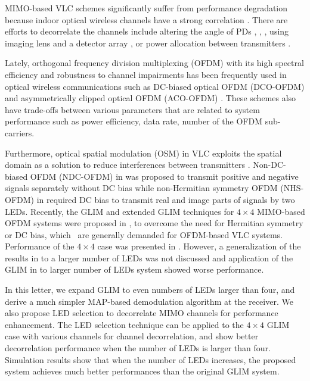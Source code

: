 \documentclass[12pt,letterpaper]{IEEEtran}
\begin{document}
MIMO-based VLC schemes significantly suffer from performance degradation because indoor optical wireless channels have a strong correlation \cite{fath_performance_2013}. There are efforts to decorrelate the channels include altering the angle of PDs \cite{fahamuel_improved_2014}, \cite{nuwanpriya_indoor_2015}, \cite{he_performance_2015}, using imaging lens and a detector array \cite{zeng_high_2009}, or power allocation between transmitters \cite{fath_performance_2013}.

Lately, orthogonal frequency division multiplexing (OFDM) with its high spectral efficiency and robustness to channel impairments has been frequently used in optical wireless communications \cite{armstrong_ofdm_2009} such as DC-biased optical OFDM (DCO-OFDM) \cite{tan_near-optimal_2016} and asymmetrically clipped optical OFDM (ACO-OFDM) \cite{armstrong_power_2006}. These schemes also have trade-offs between various parameters that are related to system performance such as power efficiency, data rate, number of the OFDM sub-carriers.

Furthermore, optical spatial modulation (OSM) in VLC exploits the spatial domain as a solution to reduce interferences between transmitters \cite{mesleh_optical_2011}. Non-DC-biased OFDM (NDC-OFDM) in \cite{li_non-dc-biased_2013} was proposed to transmit positive and negative signals separately without DC bias while non-Hermitian symmetry OFDM (NHS-OFDM) in \cite{chen_non-hermitian_2017} required DC bias to transmit real and image parts of signals by two LEDs. Recently, the GLIM and extended GLIM techniques for $4 \times 4$ MIMO-based OFDM systems were proposed in \cite{basar_generalized_2016}, \cite{yesilkaya_optical_2017} to overcome the need for Hermitian symmetry or DC bias, which  are generally demanded for OFDM-based VLC systems. Performance of the $4\times4$ case was presented in \cite{yesilkaya_optical_2017}. However, a generalization of the results in \cite{yesilkaya_optical_2017} to a larger number of LEDs was not discussed and application of the GLIM in \cite{yesilkaya_optical_2017} to larger number of LEDs system showed worse performance.

In this letter, we expand GLIM to even numbers of LEDs larger than four, and derive a much simpler MAP-based demodulation algorithm at the receiver. We also propose LED selection to decorrelate MIMO channels for performance enhancement. The LED selection technique can be applied to the $4\times 4$ GLIM case with various channels for channel decorrelation, and show better decorrelation performance when the number of LEDs is larger than four. Simulation results show that when the number of LEDs increases, the proposed system achieves much better performances than the original GLIM system.
\end{document}
